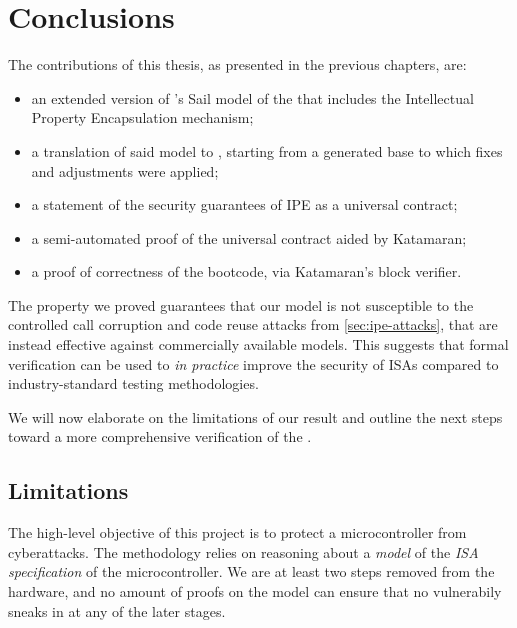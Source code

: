 \chapter{Conclusions}
\label{ch:conclusions}

The contributions of this thesis, as presented in the previous chapters, are:
\begin{itemize}
\item an extended version of \cite{mspthesis}'s Sail model of the \msp that includes the Intellectual Property Encapsulation mechanism;
\item a translation of said model to \usail, starting from a generated base to which fixes and adjustments were applied;
\item a statement of the security guarantees of IPE as a universal contract;
\item a semi-automated proof of the universal contract aided by Katamaran;
\item a proof of correctness of the \msp bootcode, via Katamaran's block verifier.
\end{itemize}

The property we proved guarantees that our model is not susceptible to the controlled call corruption and code reuse attacks from \cref{sec:ipe-attacks}, that are instead effective against commercially available \msp models. This suggests that formal verification can be used to \emph{in practice} improve the security of ISAs compared to industry-standard testing methodologies. %

We will now elaborate on the limitations of our result and outline the next steps toward a more comprehensive verification of the \msp.

\section{Limitations}


The high-level objective of this project is to protect a microcontroller from cyberattacks. The methodology relies on reasoning about a \emph{model} of the \emph{ISA specification} of the microcontroller. We are at least two steps removed from the hardware, and no amount of proofs on the model can ensure that no vulnerabily sneaks in at any of the later stages.

